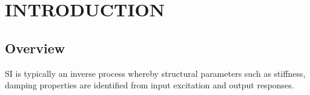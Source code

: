 \documentclass[BTech]{srmuthesis}
\begin{document}
\pagebreak
\clearpage



\chapter{INTRODUCTION}
\label{chap:intro}
\section{Overview}
 \ac{SI} is typically an inverse process whereby structural parameters such as stiffness, damping properties are identified from input excitation and output responses.
 
\end{document}
